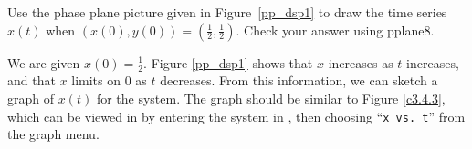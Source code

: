 \documentclass{ximera}
\begin{document}
\begin{exercise} \label{c3.4.3}
Use the phase plane picture given in Figure~\ref{pp_dsp1} to
draw the time series $x(t)$ when $(x(0),y(0)) =
\left(\frac{1}{2},\frac{1}{2}\right)$.  Check your answer using {\sf
pplane8}.

\begin{solution}

We are given $x(0) = \frac{1}{2}$.  Figure \ref{pp_dsp1}
shows that $x$ increases as $t$
increases, and that $x$ limits on $0$ as $t$ decreases.  From
this information, we can sketch a graph of $x(t)$ for the system.
The graph should be similar to Figure \ref{c3.4.3}, which can
be viewed in \Matlab by entering the system in {\pplane},
then choosing ``{\tt x vs.\ t}'' from the graph menu.

\begin{figure}[htb]
                       \centerline{%
                       }
\end{figure}

\end{solution}
\end{exercise}
\end{document}
